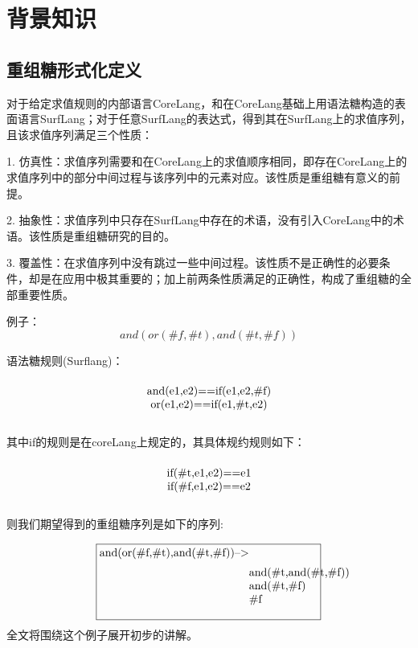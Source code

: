 \pagestyle{fancy}
\normalsize
\linespread{1.5}\selectfont
\chapter{背景知识}

\section{重组糖形式化定义}
对于给定求值规则的内部语言CoreLang，和在CoreLang基础上用语法糖构造的表面语言SurfLang；对于任意SurfLang的表达式，得到其在SurfLang上的求值序列，且该求值序列满足三个性质：

1.	仿真性：求值序列需要和在CoreLang上的求值顺序相同，即存在CoreLang上的求值序列中的部分中间过程与该序列中的元素对应。该性质是重组糖有意义的前提。

2.	抽象性：求值序列中只存在SurfLang中存在的术语，没有引入CoreLang中的术语。该性质是重组糖研究的目的。

3.	覆盖性：在求值序列中没有跳过一些中间过程。该性质不是正确性的必要条件，却是在应用中极其重要的；加上前两条性质满足的正确性，构成了重组糖的全部重要性质。

例子：
\begin{equation}
and(or(\#f,\#t),and(\#t,\#f))
\end{equation}

语法糖规则(Surflang)：
\begin{equation}
\parbox[t]{\textwidth}{%
	\begin{center}  
	and(e1,e2)==if(e1,e2,\#f)\\
	or(e1,e2)==if(e1,\#t,e2)
	\end{center}  
}%
\end{equation}


其中if的规则是在coreLang上规定的，其具体规约规则如下：
\begin{equation}
\parbox[t]{\textwidth}{%
	\begin{center}  
	if(\#t,e1,e2)==e1\\
	if(\#f,e1,e2)==e2
	\end{center}  
}%
\end{equation}

则我们期望得到的重组糖序列是如下的序列:

\begin{equation}
\framebox[20em][l]{%
	and(or(\#f,\#t),and(\#t,\#f))-->\parbox[t]{\textwidth}{%
		\begin{flushleft}  
			and(\#t,and(\#t,\#f))\\
			and(\#t,\#f)\\
			\#f
		\end{flushleft}  
	}%
}  
\end{equation}
全文将围绕这个例子展开初步的讲解。

